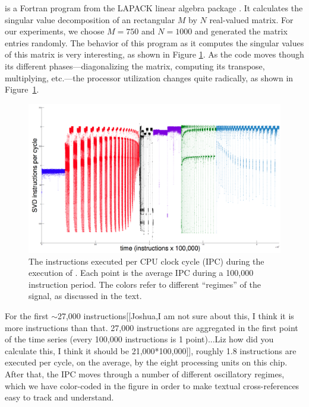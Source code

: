 \svd is a Fortran program from the LAPACK linear algebra package
\cite{lapack}.  It calculates the singular value decomposition of an
rectangular $M$ by $N$ real-valued matrix.  For our experiments, we
choose $M=750$ and $N=1000$ and generated the matrix entries randomly.
% 
% 
The behavior of this program as it computes the singular values of
this matrix is very interesting, as shown in Figure
\ref{fig:svd-ts-colored}.  As the code moves though its different
phases---diagonalizing the matrix, computing its transpose,
multiplying, etc.---the processor utilization changes quite radically,
as shown in Figure~\ref{fig:svd-ts-colored}.
\begin{figure}[t]
    \centering
    \includegraphics[width=\columnwidth]{figs/SVD1RegimesColored}
    \caption{The instructions executed per CPU clock cycle (IPC)
      during the execution of \svd. Each point is the average IPC
      during a 100,000 instruction period.  The colors refer to different
``regimes'' of the signal, as discussed in the text.}
    \label{fig:svd-ts-colored}
  \end{figure}
For the first $\sim$27,000 instructions{\color{red}[[Joshua,I am not sure about this, I think it is more instructions than that. 27,000 instructions are aggregated  in the first point of the time series (every 100,000 instructions is 1 point)...Liz how did you calculate this, I think it should be 21,000*100,000]]}, roughly 1.8 instructions are
executed per cycle, on the average, by the eight processing units on
this chip.  After that, the IPC moves through a number of different
oscillatory regimes, which we have color-coded in the figure in order
to make textual cross-references easy to track and understand.

